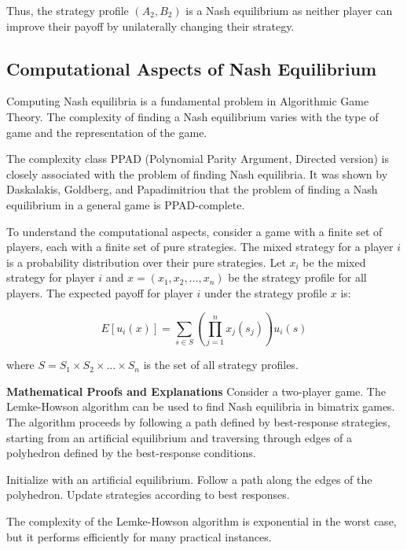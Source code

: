 \documentclass[12pt]{book} %
\begin{document}
Thus, the strategy profile $(A_2, B_2)$ is a Nash equilibrium as neither player can improve their payoff by unilaterally changing their strategy.

\subsection{Computational Aspects of Nash Equilibrium}
Computing Nash equilibria is a fundamental problem in Algorithmic Game Theory. The complexity of finding a Nash equilibrium varies with the type of game and the representation of the game.

The complexity class PPAD (Polynomial Parity Argument, Directed version) is closely associated with the problem of finding Nash equilibria. It was shown by Daskalakis, Goldberg, and Papadimitriou that the problem of finding a Nash equilibrium in a general game is PPAD-complete.

To understand the computational aspects, consider a game with a finite set of players, each with a finite set of pure strategies. The mixed strategy for a player $i$ is a probability distribution over their pure strategies. Let $x_i$ be the mixed strategy for player $i$ and $x = (x_1, x_2, \ldots, x_n)$ be the strategy profile for all players. The expected payoff for player $i$ under the strategy profile $x$ is:

\[
E[u_i(x)] = \sum_{s \in S} \left( \prod_{j=1}^{n} x_j(s_j) \right) u_i(s)
\]

where $S = S_1 \times S_2 \times \ldots \times S_n$ is the set of all strategy profiles.

\textbf{Mathematical Proofs and Explanations}
Consider a two-player game. The Lemke-Howson algorithm can be used to find Nash equilibria in bimatrix games. The algorithm proceeds by following a path defined by best-response strategies, starting from an artificial equilibrium and traversing through edges of a polyhedron defined by the best-response conditions.
\FloatBarrier
\begin{algorithm}[H]
\caption{Lemke-Howson Algorithm for Bimatrix Games}
\begin{algorithmic}[1]
\State Initialize with an artificial equilibrium.
\Repeat
    \State Follow a path along the edges of the polyhedron.
    \State Update strategies according to best responses.
\end{algorithmic}
\end{algorithm}
\FloatBarrier
The complexity of the Lemke-Howson algorithm is exponential in the worst case, but it performs efficiently for many practical instances.
\end{document}
